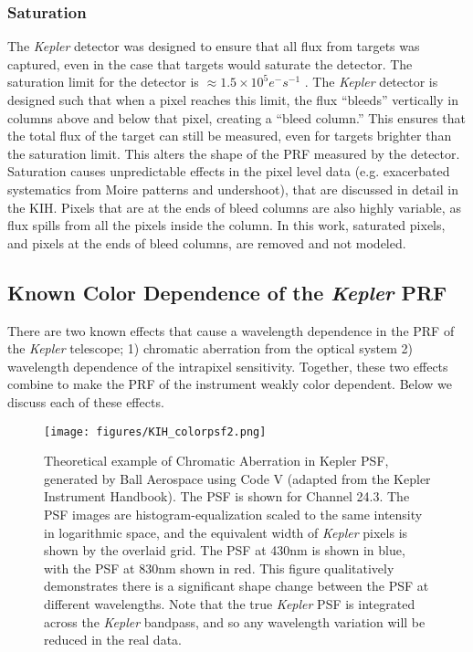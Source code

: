 \documentclass[iop]{emulateapj}
\newcommand{\kepler}{\emph{Kepler}\xspace}
\begin{document}
\subsubsection{Saturation}
\label{sec:saturation}
The \kepler detector was designed to ensure that all flux from targets was captured, even in the case that targets would saturate the detector. The saturation limit for the detector is $\approx 1.5 \times 10^5 e^-s^{-1}$ . The \kepler detector is designed such that when a pixel reaches this limit, the flux ``bleeds'' vertically in columns above and below that pixel, creating a ``bleed column.'' This ensures that the total flux of the target can still be measured, even for targets brighter than the saturation limit. This alters the shape of the PRF measured by the detector. Saturation causes unpredictable effects in the pixel level data (e.g. exacerbated systematics from Moire patterns and undershoot), that are discussed in detail in the KIH. Pixels that are at the ends of bleed columns are also highly variable, as flux spills from all the pixels inside the column. In this work, saturated pixels, and pixels at the ends of bleed columns, are removed and not modeled.


\subsection{Known Color Dependence of the \kepler PRF}
\label{sec:color}

There are two known effects that cause a wavelength dependence in the PRF of the \kepler telescope; 1) chromatic aberration from the optical system 2) wavelength dependence of the intrapixel sensitivity. Together, these two effects combine to make the PRF of the instrument weakly color dependent. Below we discuss each of these effects.

\begin{figure}
    \centering
    \texttt{[image: figures/KIH\_colorpsf2.png]}
    \caption{
    Theoretical example of Chromatic Aberration in Kepler PSF, generated by Ball Aerospace using Code V (adapted from the Kepler Instrument Handbook). The PSF is shown for Channel 24.3. The PSF images are histogram-equalization scaled to the same intensity in logarithmic space, and the equivalent width of \kepler pixels is shown by the overlaid grid. The PSF at 430nm is shown in blue, with the PSF at 830nm shown in red. This figure qualitatively demonstrates there is a significant shape change between the PSF at different wavelengths. Note that the true \kepler PSF is integrated across the \kepler bandpass, and so any wavelength variation will be reduced in the real data.}
    \label{fig:psf_demo}
\end{figure}
\end{document}
